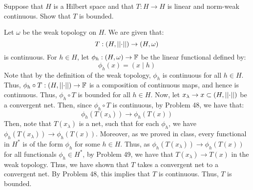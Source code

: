 \documentclass[12pt]{article}
\begin{document}
\begin{problem}{6}
    Suppose that $H$ is a Hilbert space and that $T : H \to H$ is linear and norm-weak continuous. Show that $T$ is bounded.
\end{problem}
\begin{solution}
    Let $\omega$ be the weak topology on $H$. We are given that: 
    \[ T: (H, \left\vert\left\vert\cdot\right\vert\right\vert) \to (H, \omega)\]
    is continuous. For $h \in H$, let $\phi_h: (H, \omega) \to \mathbb F$ be the linear functional defined by: 
    \[ \phi_h(x) = (x \mid h) \]
    Note that by the definition of the weak topology, $\phi_h$ is continuous for all $h \in H$. Thus, $\phi_h \circ T: (H, \left\vert\left\vert\cdot\right\vert\right\vert) \to \mathbb F$ is a composition of continuous maps, and hence is continuous. Thus, $\phi_h \circ T$ is bounded for all $h \in H$. \bbni 
    Now, let $x_\lambda \to x \subset (H, \left\vert\left\vert\cdot\right\vert\right\vert)$ be a convergent net. Then, since $\phi_h \circ T$ is continuous, by Problem 48, we have that:
    \[ \phi_h(T(x_\lambda))  \to \phi_h(T(x))\]
    Then, note that $T(x_\lambda)$ is a net, such that for each $\phi_h$, we have $\phi_h(T(x_\lambda)) \to \phi_h(T(x))$. Moreover, as we proved in class, every functional in $H^*$ is of the form $\phi_h$ for some $h \in H$. Thus, as $\phi_h(T(x_\lambda)) \to \phi_h(T(x))$ for all functionals $\phi_h \in H^*$, by Problem 49, we have that $T(x_\lambda) \to T(x)$ in the weak topology. \bbni
    Thus, we have shown that $T$ takes a convergent net to a convergent net. By Problem 48, this implies that $T$ is continuous. Thus, $T$ is bounded.    
\end{solution}
\end{document}
